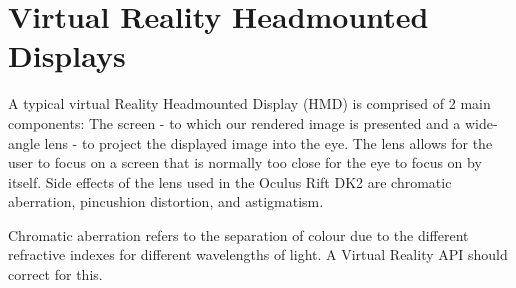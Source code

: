 \documentclass[12pt,a4paper,twoside,openright]{report}
\begin{document}
\clearpage

\section{Virtual Reality Headmounted Displays}\label{vrdisplays}

A typical virtual Reality Headmounted Display (HMD) is comprised of 2 main components: The screen - to which our rendered image is presented and a wide-angle lens - to project the displayed image into the eye. The lens allows for the user to focus on a screen that is normally too close for the eye to focus on by itself. 
Side effects of the lens used in the Oculus Rift DK2 are chromatic aberration, pincushion distortion, and astigmatism. \par Chromatic aberration refers to the separation of colour due to the different refractive indexes for different wavelengths of light. A Virtual Reality API should correct for this. \par
\end{document}
